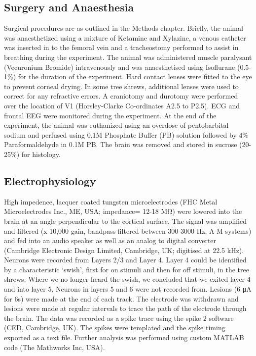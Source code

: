 		\subsection{Surgery and Anaesthesia}
		Surgical procedures are as outlined in the Methods chapter. Briefly, the animal was anaesthetized using a mixture of Ketamine and Xylazine, a venous catheter was inserted in to the femoral vein and a tracheostomy performed to assist in breathing during the experiment. The animal was administered muscle paralysant (Vecuronium Bromide) intravenously and was anaesthetised using Isoflurane (0.5-1\%) for the duration of the experiment. Hard contact lenses were fitted to the eye to prevent corneal drying. In some tree shrews, additional lenses were used to correct for any refractive errors. A craniotomy and durotomy were performed over the location of V1 (Horsley-Clarke Co-ordinates A2.5 to P2.5). ECG and frontal EEG were monitored during the experiment. At the end of the experiment, the animal was euthanized using an overdose of pentobarbital sodium and perfused using 0.1M Phosphate Buffer (PB) solution followed by 4\% Paraformaldehyde in 0.1M PB. The brain was removed and stored in sucrose (20-25\%) for histology.
	
		\subsection{Electrophysiology}
		High impedence, lacquer coated tungsten microelectrodes (FHC Metal Microelectrodes Inc., ME, USA; impedance= 12-18 MΩ) were lowered into the brain at an angle perpendicular to the cortical surface. The signal was amplified and filtered (x 10,000 gain, bandpass filtered between 300-3000 Hz, A-M systems) and fed into an audio speaker as well as an analog to digital converter (Cambridge Electronic Design Limited, Cambridge, UK; digitised at 22.5 kHz). Neurons were recorded from Layers 2/3 and Layer 4. Layer 4 could be identified by a characteristic ‘swish’, first for on stimuli and then for off stimuli, in the tree shrews. Where we no longer heard the swish, we concluded that we exited layer 4 and into layer 5. Neurons in layers 5 and 6 were not recorded from. Lesions (6 μA for 6s) were made at the end of each track. The electrode was withdrawn and lesions were made at regular intervals to trace the path of the electrode through the brain. The data was recorded as a spike trace using the spike 2 software (CED, Cambridge, UK). The spikes were templated and the spike timing exported as a text file. Further analysis was performed using custom MATLAB code (The Mathworks Inc, USA).
